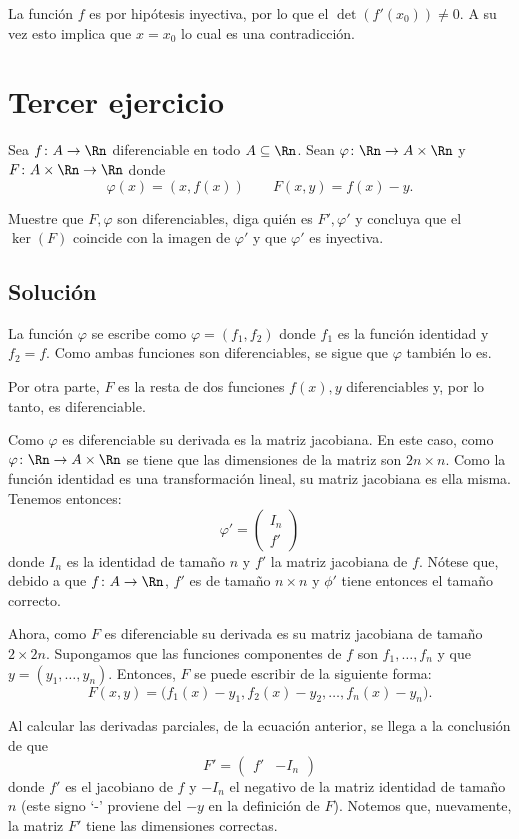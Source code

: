 \documentclass{scrartcl}
\begin{document}
La función \(f\) es por hipótesis inyectiva,
por lo que el \(\det(f'(x_0))\neq 0\).
A su vez esto implica que \(x = x_0\)
lo cual es una contradicción.

\section{Tercer ejercicio}

Sea \(f\colon A\to\Rn\) diferenciable en todo
\(A\subseteq\Rn\). Sean \(\varphi\colon \Rn\to A\times\Rn\)
y \(F\colon A\times\Rn\to\Rn\) donde
\[\varphi(x) = (x,f(x))\qquad F(x,y) = f(x)-y.\]

Muestre que \(F,\varphi\) son diferenciables,
diga quién es \(F', \varphi'\) y concluya que
el \(\ker(F)\) coincide con la imagen de \(\varphi'\)
y que \(\varphi'\) es inyectiva.

\subsection{Solución}

La función \(\varphi\) se escribe como
\(\varphi=(f_1,f_2)\) donde \(f_1\) es la función
identidad y \(f_2 = f\). Como ambas funciones son
diferenciables, se sigue que \(\varphi\) también lo es.

Por otra parte, \(F\) es la resta de dos funciones
\(f(x),y\)
diferenciables y, por lo tanto, es diferenciable. 

Como \(\varphi\) es diferenciable su derivada
es la matriz jacobiana. En este caso, como
\(\varphi\colon \Rn\to A\times\Rn\) se tiene que las dimensiones
de la matriz son \(2n\times n\).
Como la función identidad es una transformación lineal,
su matriz jacobiana es ella misma.
Tenemos entonces:
\[
\varphi' = 
    \begin{pmatrix}
    I_{n} \\
    f'
    \end{pmatrix}
\]
donde \(I_{n}\) es la identidad de tamaño \(n\)
y \(f'\) la matriz jacobiana de \(f\).
Nótese que, debido a que \(f\colon A\to\Rn\),
\(f'\) es de tamaño \(n\times n\) y \(\phi'\)
tiene entonces el tamaño correcto.

Ahora, como \(F\) es diferenciable su derivada
es su matriz jacobiana de tamaño
\(2\times 2n\). Supongamos que las funciones
componentes de \(f\) son \(f_1,\dots,f_n\)
y que \(y = (y_1,\dots,y_n)\).
Entonces, \(F\) se puede escribir de la siguiente
forma:
\[
F(x,y) = \big(f_1(x)-y_1, f_2(x)-y_2, \dots, f_n(x)-y_n\big).
\]

Al calcular las derivadas parciales, de la ecuación anterior,
se llega a la conclusión de que
\[
F' = 
    \begin{pmatrix}
    f' & -I_n
    \end{pmatrix}
\]
donde \(f'\) es el jacobiano de \(f\) y \(-I_n\)
el negativo de la matriz identidad de tamaño \(n\)
(este signo `-' proviene del \(-y\) en la definición de \(F\)).
Notemos que, nuevamente, la matriz \(F'\) tiene las dimensiones
correctas.
\end{document}
